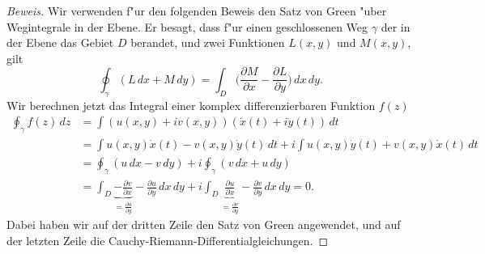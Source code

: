 \begin{proof}[Beweis]
Wir verwenden f"ur den folgenden Beweis den Satz von Green "uber
%
Wegintegrale in der Ebene.
Er besagt, dass f"ur einen geschlossenen Weg $\gamma$ der in der Ebene
das Gebiet $D$ berandet, und zwei Funktionen $L(x,y)$ und $M(x,y)$, gilt
\[
\oint_\gamma(L\,dx + M\,dy)
=
\int_D \biggl(\frac{\partial M}{\partial x}
-\frac{\partial L}{\partial y}\biggr)\,dx\,dy.
\]
Wir berechnen jetzt das Integral einer komplex differenzierbaren Funktion
$f(z)$
\begin{align*}
\oint_\gamma f(z)\,dz
&=
\int (u(x,y)+iv(x,y))(\dot x(t)+i\dot y(t))\,dt
\\
&=
\int u(x,y)\dot x(t) -v(x,y)\dot y(t)\,dt
+
i \int u(x,y)\dot y(t)+v(x,y)\dot x(t)\,dt
\\
&=\oint_\gamma(u\,dx - v\,dy) + i\oint_\gamma(v\,dx + u\,dy)
\\
&=
\int_D
\underbrace{-\frac{\partial v}{\partial x}}_{\displaystyle=\frac{\partial u}{\partial y}}
-\frac{\partial u}{\partial y}
\,dx\,dy
+i
\int_D
\underbrace{\frac{\partial u}{\partial x}}_{\displaystyle=\frac{\partial v}{\partial y}}
-\frac{\partial v}{\partial y}\,dx\,dy
=0.
\end{align*}
Dabei haben wir auf der dritten Zeile den Satz von Green angewendet,
und auf der letzten Zeile die Cauchy-Riemann-Differentialgleichungen.
\end{proof}


